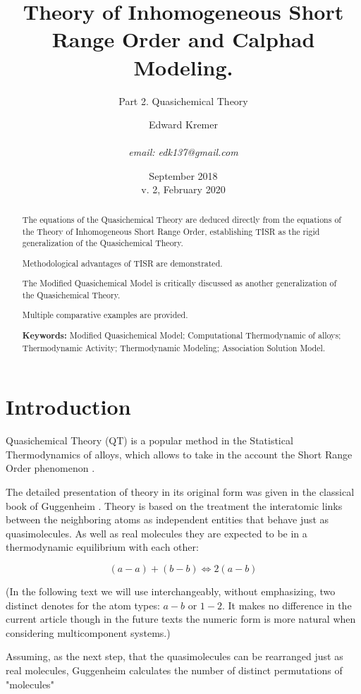 \documentclass[12pt,abstract]{scrartcl}
\title{Theory of Inhomogeneous Short Range Order and Calphad Modeling. }
\author{Edward Kremer \\ \\ \textit{email: edk137@gmail.com}}
\subtitle{Part 2. Quasichemical Theory}
\date{September 2018 \\ v. 2, February  2020}
\begin{document}
\maketitle

\begin{abstract}

The equations of the Quasichemical Theory are  deduced directly  from the equations of  the Theory of Inhomogeneous Short Range Order, establishing TISR  as the rigid generalization of the Quasichemical Theory.

Methodological advantages of TISR are demonstrated.

The Modified Quasichemical Model is critically discussed as another generalization of the  Quasichemical Theory.


Multiple comparative examples are provided.

\textbf{Keywords:} Modified Quasichemical Model; Computational Thermodynamic of alloys; Thermodynamic Activity; Thermodynamic Modeling; Association Solution Model.

\end{abstract}

\section{Introduction}
Quasichemical Theory (QT) is a popular method in the Statistical Thermodynamics of alloys, which allows to take in the account the Short Range Order phenomenon \cite{hanslukas2007,Hillert2008}. 

The detailed presentation of theory in its original form was given in the classical book of Guggenheim \cite{GUGGENHEIM1952}. Theory is based on the treatment the interatomic links between the neighboring atoms as independent entities that behave just as quasimolecules. As well as real molecules they are expected to be    in a thermodynamic equilibrium with each other:

\begin{equation} \label{equilibrium}
(a - a) + (b - b) \Leftrightarrow  2 (a - b)
\end{equation} 

(In the following text we will use interchangeably, without emphasizing, two distinct denotes for the atom types:  $a-b$ or $1-2$. It makes no difference in the current article though in the future texts the numeric form is more natural when considering multicomponent systems.) 

Assuming, as the next step, that the quasimolecules can be rearranged just as real molecules, Guggenheim calculates the number of distinct  permutations of "molecules" 
\end{document}
